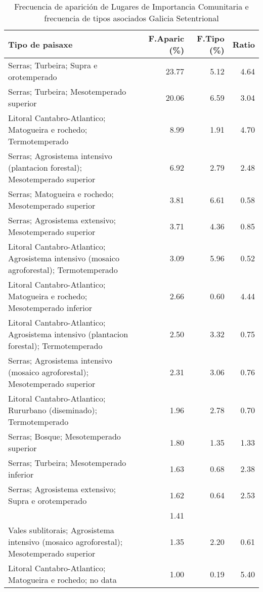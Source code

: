 \begin{table}[p]
\centering
\caption{Frecuencia de aparición de Lugares de Importancia Comunitaria e frecuencia de tipos asociados Galicia Setentrional} 
\label{vnatura10}
\begin{tabular}{lrrr}
  \hline
Tipo de paisaxe & F.Aparic (\%) & F.Tipo (\%) & Ratio \\ 
  \hline
Serras; Turbeira; Supra e orotemperado & 23.77 & 5.12 & 4.64 \\ 
  Serras; Turbeira; Mesotemperado superior & 20.06 & 6.59 & 3.04 \\ 
  Litoral Cantabro-Atlantico; Matogueira e rochedo; Termotemperado & 8.99 & 1.91 & 4.70 \\ 
  Serras; Agrosistema intensivo (plantacion forestal); Mesotemperado superior & 6.92 & 2.79 & 2.48 \\ 
  Serras; Matogueira e rochedo; Mesotemperado superior & 3.81 & 6.61 & 0.58 \\ 
  Serras; Agrosistema extensivo; Mesotemperado superior & 3.71 & 4.36 & 0.85 \\ 
  Litoral Cantabro-Atlantico; Agrosistema intensivo (mosaico agroforestal); Termotemperado & 3.09 & 5.96 & 0.52 \\ 
  Litoral Cantabro-Atlantico; Matogueira e rochedo; Mesotemperado inferior & 2.66 & 0.60 & 4.44 \\ 
  Litoral Cantabro-Atlantico; Agrosistema intensivo (plantacion forestal); Termotemperado & 2.50 & 3.32 & 0.75 \\ 
  Serras; Agrosistema intensivo (mosaico agroforestal); Mesotemperado superior & 2.31 & 3.06 & 0.76 \\ 
  Litoral Cantabro-Atlantico; Rururbano (diseminado); Termotemperado & 1.96 & 2.78 & 0.70 \\ 
  Serras; Bosque; Mesotemperado superior & 1.80 & 1.35 & 1.33 \\ 
  Serras; Turbeira; Mesotemperado inferior & 1.63 & 0.68 & 2.38 \\ 
  Serras; Agrosistema extensivo; Supra e orotemperado & 1.62 & 0.64 & 2.53 \\ 
   & 1.41 &  &  \\ 
  Vales sublitorais; Agrosistema intensivo (mosaico agroforestal); Mesotemperado superior & 1.35 & 2.20 & 0.61 \\ 
  Litoral Cantabro-Atlantico; Matogueira e rochedo; no data & 1.00 & 0.19 & 5.40 \\ 
   \hline
\end{tabular}
\end{table}
